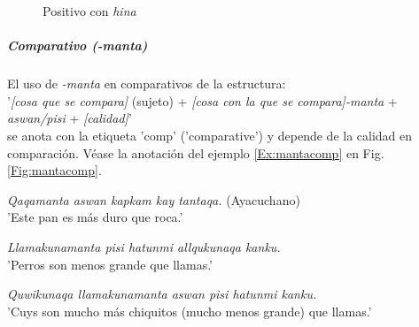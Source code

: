 \documentclass[a4paper,11pt,DIV12]{scrartcl}
\begin{document}
\begin{figure}
\begin{center}
\caption{Positivo con {\em hina}}\label{Fig:hinacomp}
\end{center}
\end{figure}

\subparagraph{Comparativo ({\em -manta})}

El uso de {\em -manta} en comparativos de la estructura:\\
'{\em [cosa que se compara]} (sujeto) + {\em [cosa con la que se compara]-manta} + {\em aswan/pisi} + {\em[calidad]}'\\
se anota con la etiqueta 'comp' ('comparative') y depende de la calidad en comparaci\'on. V\'ease la anotaci\'on del ejemplo \ref{Ex:mantacomp} en Fig. \ref{Fig:mantacomp}.

\begin{examples}
 \item {\em Qaqamanta aswan kapkam kay tantaqa.} (Ayacuchano)\\
      'Este pan es m\'as duro que roca.'
 \item\label{Ex:mantacomp} {\em Llamakunamanta pisi hatunmi allqukunaqa kanku.}\\
      'Perros son menos grande que llamas.'
 \item {\em Quwikunaqa llamakunamanta aswan pisi hatunmi kanku.}\\
      'Cuys son mucho m\'as chiquitos (mucho menos grande) que llamas.'\\
	\hfill{\small \citep[189-190]{Dedenbach02}}
\end{examples}
\end{document}
